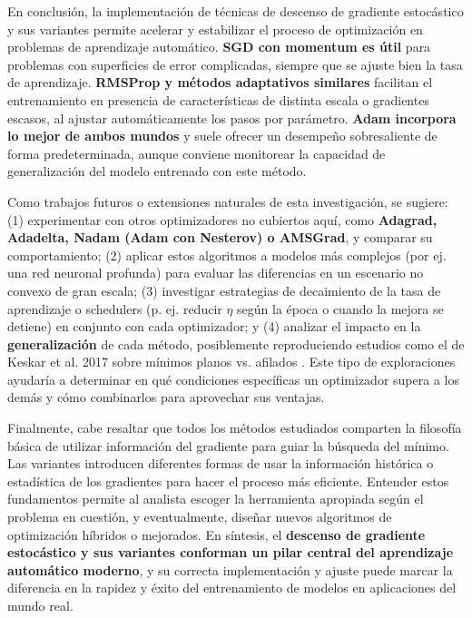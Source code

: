 \documentclass[12pt, spanish]{article}
\begin{document}
En conclusión, la implementación de técnicas de descenso de gradiente estocástico y sus variantes permite acelerar y estabilizar el proceso de optimización en problemas de aprendizaje automático. \textbf{SGD con momentum es útil} para problemas con superficies de error complicadas, siempre que se ajuste bien la tasa de aprendizaje. \textbf{RMSProp y métodos adaptativos similares} facilitan el entrenamiento en presencia de características de distinta escala o gradientes escasos, al ajustar automáticamente los pasos por parámetro. \textbf{Adam incorpora lo mejor de ambos mundos} y suele ofrecer un desempeño sobresaliente de forma predeterminada, aunque conviene monitorear la capacidad de generalización del modelo entrenado con este método.

Como trabajos futuros o extensiones naturales de esta investigación, se sugiere: (1) experimentar con otros optimizadores no cubiertos aquí, como \textbf{Adagrad, Adadelta, Nadam (Adam con Nesterov) o AMSGrad}, y comparar su comportamiento; (2) aplicar estos algoritmos a modelos más complejos (por ej. una red neuronal profunda) para evaluar las diferencias en un escenario no convexo de gran escala; (3) investigar estrategias de decaimiento de la tasa de aprendizaje o schedulers (p. ej. reducir $\eta$ según la época o cuando la mejora se detiene) en conjunto con cada optimizador; y (4) analizar el impacto en la \textbf{generalización} de cada método, posiblemente reproduciendo estudios como el de Keskar et al. 2017 sobre mínimos planos vs. afilados \cite{ref5}. Este tipo de exploraciones ayudaría a determinar en qué condiciones específicas un optimizador supera a los demás y cómo combinarlos para aprovechar sus ventajas.

Finalmente, cabe resaltar que todos los métodos estudiados comparten la filosofía básica de utilizar información del gradiente para guiar la búsqueda del mínimo. Las variantes introducen diferentes formas de usar la información histórica o estadística de los gradientes para hacer el proceso más eficiente. Entender estos fundamentos permite al analista escoger la herramienta apropiada según el problema en cuestión, y eventualmente, diseñar nuevos algoritmos de optimización híbridos o mejorados. En síntesis, el \textbf{descenso de gradiente estocástico y sus variantes conforman un pilar central del aprendizaje automático moderno}, y su correcta implementación y ajuste puede marcar la diferencia en la rapidez y éxito del entrenamiento de modelos en aplicaciones del mundo real.
\end{document}
